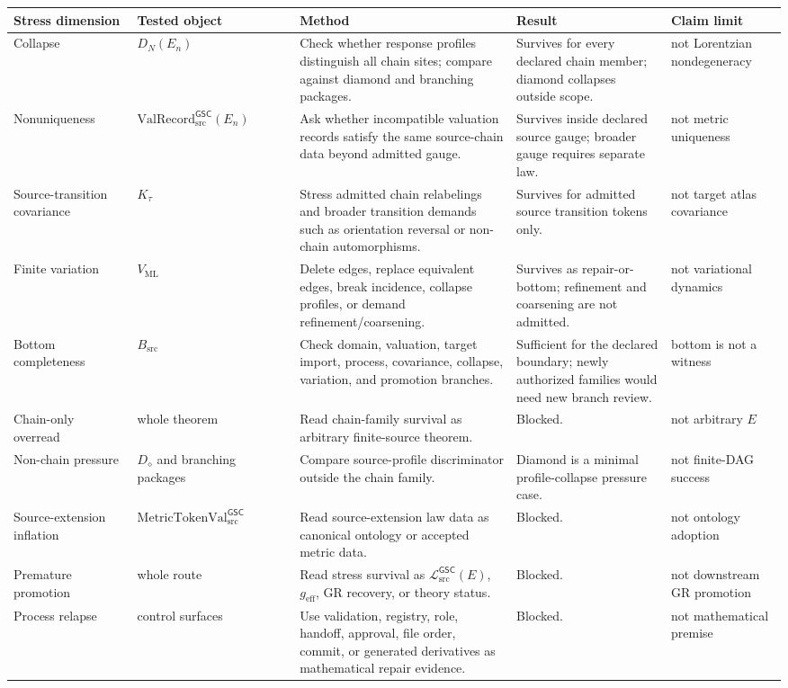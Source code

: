 \documentclass[11pt]{article}
\newcommand{\MetricTokenVal}{\mathrm{MetricTokenVal}_{\mathrm{src}}^{\mathsf{GSC}}}
\newcommand{\MetricData}{\mathcal{L}_{\mathrm{src}}^{\mathsf{GSC}}}
\newcommand{\ValRecord}{\mathrm{ValRecord}_{\mathrm{src}}^{\mathsf{GSC}}}
\newcommand{\geff}{g_{\mathrm{eff}}}
\newcommand{\En}{E_n}
\newcommand{\Ddiamond}{D_{\diamond}}
\begin{document}
\begin{longtable}{p{0.16\linewidth}p{0.21\linewidth}p{0.28\linewidth}p{0.20\linewidth}p{0.15\linewidth}}
\toprule
Stress dimension & Tested object & Method & Result & Claim limit \\
\midrule
Collapse &
\(D_N(\En)\) &
Check whether response profiles distinguish all chain sites; compare against
diamond and branching packages. &
Survives for every declared chain member; diamond collapses outside scope. &
not Lorentzian nondegeneracy \\
Nonuniqueness &
\(\ValRecord(\En)\) &
Ask whether incompatible valuation records satisfy the same source-chain
data beyond admitted gauge. &
Survives inside declared source gauge; broader gauge requires separate law. &
not metric uniqueness \\
Source-transition covariance &
\(K_{\tau}\) &
Stress admitted chain relabelings and broader transition demands such as
orientation reversal or non-chain automorphisms. &
Survives for admitted source transition tokens only. &
not target atlas covariance \\
Finite variation &
\(V_{\mathrm{ML}}\) &
Delete edges, replace equivalent edges, break incidence, collapse profiles,
or demand refinement/coarsening. &
Survives as repair-or-bottom; refinement and coarsening are not admitted. &
not variational dynamics \\
Bottom completeness &
\(B_{\mathrm{src}}\) &
Check domain, valuation, target import, process, covariance, collapse,
variation, and promotion branches. &
Sufficient for the declared boundary; newly authorized families would need
new branch review. &
bottom is not a witness \\
Chain-only overread &
whole theorem &
Read chain-family survival as arbitrary finite-source theorem. &
Blocked. &
not arbitrary \(E\) \\
Non-chain pressure &
\(\Ddiamond\) and branching packages &
Compare source-profile discriminator outside the chain family. &
Diamond is a minimal profile-collapse pressure case. &
not finite-DAG success \\
Source-extension inflation &
\(\MetricTokenVal\) &
Read source-extension law data as canonical ontology or accepted metric data. &
Blocked. &
not ontology adoption \\
Premature promotion &
whole route &
Read stress survival as \(\MetricData(E)\), \(\geff\), GR recovery, or theory
status. &
Blocked. &
not downstream GR promotion \\
Process relapse &
control surfaces &
Use validation, registry, role, handoff, approval, file order, commit, or
generated derivatives as mathematical repair evidence. &
Blocked. &
not mathematical premise \\
\bottomrule
\end{longtable}
\end{document}
